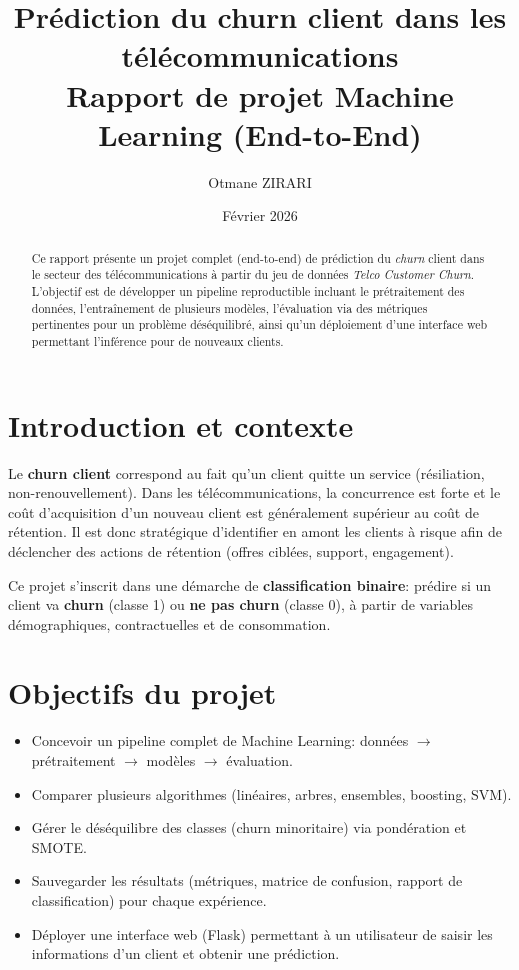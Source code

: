 \documentclass[11pt,a4paper]{article}
\title{\textbf{Pr\'ediction du churn client dans les t\'el\'ecommunications}\\\vspace{0.3cm}\large Rapport de projet Machine Learning (End-to-End)}
\author{Otmane ZIRARI}
\date{F\'evrier 2026}
\begin{document}
\maketitle

\begin{abstract}
Ce rapport pr\'esente un projet complet (end-to-end) de pr\'ediction du \emph{churn} client dans le secteur des t\'el\'ecommunications \`a partir du jeu de donn\'ees \emph{Telco Customer Churn}. L'objectif est de d\'evelopper un pipeline reproductible incluant le pr\'etraitement des donn\'ees, l'entra\^inement de plusieurs mod\`eles, l'\'evaluation via des m\'etriques pertinentes pour un probl\`eme d\'es\'equilibr\'e, ainsi qu'un d\'eploiement d'une interface web permettant l'inf\'erence pour de nouveaux clients.
\end{abstract}

\tableofcontents
\newpage

\section{Introduction et contexte}
Le \textbf{churn client} correspond au fait qu'un client quitte un service (r\'esiliation, non-renouvellement). Dans les t\'el\'ecommunications, la concurrence est forte et le co\^ut d'acquisition d'un nouveau client est g\'en\'eralement sup\'erieur au co\^ut de r\'etention. Il est donc strat\'egique d'identifier en amont les clients \`a risque afin de d\'eclencher des actions de r\'etention (offres cibl\'ees, support, engagement).

Ce projet s'inscrit dans une d\'emarche de \textbf{classification binaire}: pr\'edire si un client va \textbf{churn} (classe 1) ou \textbf{ne pas churn} (classe 0), \`a partir de variables d\'emographiques, contractuelles et de consommation.

\section{Objectifs du projet}
\begin{itemize}
  \item Concevoir un pipeline complet de Machine Learning: donn\'ees $\rightarrow$ pr\'etraitement $\rightarrow$ mod\`eles $\rightarrow$ \'evaluation.
  \item Comparer plusieurs algorithmes (lin\'eaires, arbres, ensembles, boosting, SVM).
  \item G\'erer le d\'es\'equilibre des classes (churn minoritaire) via pond\'eration et SMOTE.
  \item Sauvegarder les r\'esultats (m\'etriques, matrice de confusion, rapport de classification) pour chaque exp\'erience.
  \item D\'eployer une interface web (Flask) permettant \`a un utilisateur de saisir les informations d'un client et obtenir une pr\'ediction.
\end{itemize}
\end{document}
